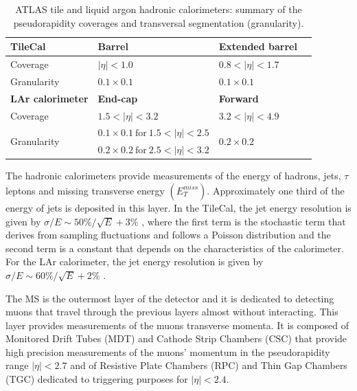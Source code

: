 \begin{table}
	\centering
	\begin{tabular}{llll}
		\toprule 
		\textbf{TileCal} & \textbf{Barrel} & \textbf{Extended barrel} &\\
		\midrule
		Coverage & $|\eta|<1.0$ & $0.8<|\eta|<1.7$  & \\
		Granularity & $0.1\times 0.1$ & $0.1\times 0.1$ & \\
		\midrule \midrule
		\textbf{LAr calorimeter} & \textbf{End-cap} & \textbf{Forward} &\\
		\midrule
		Coverage & $1.5<|\eta|<3.2$ & $3.2<|\eta|<4.9$  &  \\
		\multirow{2}{*}{Granularity} & $0.1\times 0.1 ~\text{for}~ 1.5<|\eta|<2.5$ & \multirow{2}{*}{$0.2\times 0.2$} & \\
		& $0.2\times 0.2 ~\text{for}~ 2.5<|\eta|<3.2$ & & \\
		\bottomrule
	\end{tabular}
	\caption{ATLAS tile and liquid argon hadronic calorimeters: summary of the pseudorapidity coverages and transversal segmentation (granularity).}
	\label{table:ATLAS_HCAL}
\end{table}

The hadronic calorimeters provide measurements of the energy of hadrons, jets, $\tau$ leptons and missing transverse energy $\left(E_T^{miss}\right)$. Approximately one third of the energy of jets is deposited in this layer. In the TileCal, the jet energy resolution is given by $\sigma/E\sim 50\%/\sqrt{E}+3\%$ \cite{TileCalTech},
where the first term is the stochastic term that derives from sampling fluctuations and follows a Poisson distribution and the second term is a constant that depends on the characteristics of the calorimeter. For the LAr calorimeter, the jet energy resolution is given by $\sigma/E\sim 60\%/\sqrt{E}+2\%$ \cite{ATLAS_LAr_TDR}.

The MS is the outermost layer of the detector and it is dedicated to detecting muons that travel through the previous layers almost without interacting. This layer provides measurements of the muons transverse momenta. It is composed of Monitored Drift Tubes (MDT) and Cathode Strip Chambers (CSC) that provide high precision measurements of the muons' momentum in the pseudorapidity range $|\eta|<2.7$ and of Resistive Plate Chambers (RPC) and Thin Gap Chambers (TGC) dedicated to triggering purposes for $|\eta|<2.4$.

